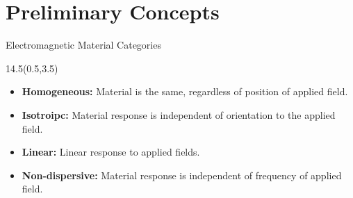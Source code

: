 \section{Preliminary Concepts}
\begin{frame}{Electromagnetic Material Categories}
		\begin{textblock}{14.5}(0.5,3.5)
			\begin{itemize}
				\setlength\itemsep{18pt}
				\item \textbf{Homogeneous:} Material is the same, regardless of position of applied field. 

			
				\item \textbf{Isotroipc: } Material response is independent of orientation to the applied field. 
				
				\item \textbf{Linear: } Linear response to applied fields. 
			
				\item \textbf{Non-dispersive: } Material response is independent of frequency of applied field. 
			\end{itemize}
		\end{textblock}
\end{frame}


%


%
%




